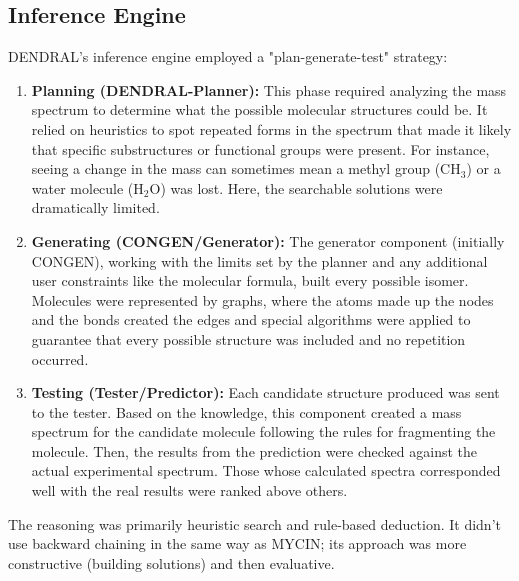\documentclass[12pt,a4paper]{article}
\begin{document}
\subsection{Inference Engine}
DENDRAL's inference engine employed a "plan-generate-test" strategy:
\begin{enumerate}
    \item \textbf{Planning (DENDRAL-Planner):} This phase required analyzing the mass spectrum to determine what the possible molecular structures could be. It relied on heuristics to spot repeated forms in the spectrum that made it likely that specific substructures or functional groups were present. For instance, seeing a change in the mass can sometimes mean a methyl group (CH$_3$) or a water molecule (H$_2$O) was lost. Here, the searchable solutions were dramatically limited.
    \item \textbf{Generating (CONGEN/Generator):} The generator component (initially CONGEN), working with the limits set by the planner and any additional user constraints like the molecular formula, built every possible isomer. Molecules were represented by graphs, where the atoms made up the nodes and the bonds created the edges and special algorithms were applied to guarantee that every possible structure was included and no repetition occurred.
    \item \textbf{Testing (Tester/Predictor):} Each candidate structure produced was sent to the tester. Based on the knowledge, this component created a mass spectrum for the candidate molecule following the rules for fragmenting the molecule. Then, the results from the prediction were checked against the actual experimental spectrum. Those whose calculated spectra corresponded well with the real results were ranked above others.
\end{enumerate}
The reasoning was primarily heuristic search and rule-based deduction. It didn't use backward chaining in the same way as MYCIN; its approach was more constructive (building solutions) and then evaluative.
\end{document}
